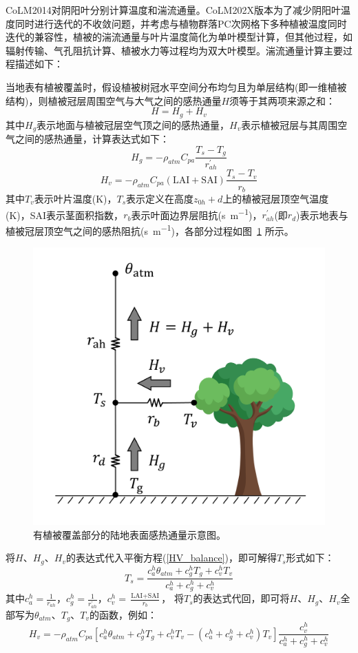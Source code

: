 CoLM2014对阴阳叶分别计算温度和湍流通量。CoLM202X版本为了减少阴阳叶温度同时进行迭代的不收敛问题，并考虑与植物群落PC次网格下多种植被温度同时迭代的兼容性，植被的湍流通量与叶片温度简化为单叶模型计算，但其他过程，如辐射传输、气孔阻抗计算、植被水力等过程均为双大叶模型。湍流通量计算主要过程描述如下：

当地表有植被覆盖时，假设植被树冠水平空间分布均匀且为单层结构(即一维植被结构)，则植被冠层周围空气与大气之间的感热通量$H$须等于其两项来源之和：
\begin{equation}\label{HV_balance}
H=H_{g}+H_{v}
\end{equation}
其中$H_{g}$表示地面与植被冠层空气顶之间的感热通量，$H_{v}$表示植被冠层与其周围空气之间的感热通量，计算表达式如下：
\begin{equation}
H_{g}=-\rho_{atm} C_{pa} \frac{T_{s}-T_{g}}{r_{a h}^{\prime}}
\end{equation}
\begin{equation}
H_{v}=-\rho_{atm} C_{pa}(\text {LAI}+\text {SAI}) \frac{T_{s}-T_{v}}{r_{b}}
\end{equation}
其中$T_v$表示叶片温度(K)，$T_s$表示定义在高度$z_{0h}+d$上的植被冠层顶空气温度(K)，SAI表示茎面积指数，$r_b$表示叶面边界层阻抗(\unit{s.m^{-1}})，$r_{ah}^\prime$(即$r_d$)表示地表与植被冠层顶空气之间的感热阻抗(\unit{s.m^{-1}})，各部分过程如图~\ref{fig:有植被覆盖部分的陆地表面感热通量示意图} 所示。
{
\begin{figure}[htbp]
\centering
\includegraphics[width=0.6\linewidth]{Figures/地表湍流交换过程/有植被感热交换阻抗示意图.png}
\caption{有植被覆盖部分的陆地表面感热通量示意图。}
\label{fig:有植被覆盖部分的陆地表面感热通量示意图}
\end{figure}
}
将$H$、$H_{g}$、$H_{v}$的表达式代入平衡方程(\ref{HV_balance})，即可解得$T_s$形式如下：
\begin{equation}
T_{s}=\frac{c_{a}^{h} \theta_{atm}+c_{g}^{h} T_{g}+c_{v}^{h} T_{v}}{c_{a}^{h}+c_{g}^{h}+c_{v}^{h}}
\end{equation}
其中$c_a^h=\frac{1}{r_{ah}}$，$c_g^h=\frac{1}{r_{ah}^\prime}$，$c_v^h=\frac{\text {LAI}+\text {SAI}}{r_b}$，
将$T_s$的表达式代回，即可将$H$、$H_{g}$、$H_{v}$全部写为$\theta_{atm}$、$T_g$、$T_v$的函数，例如：
\begin{equation}
H_{v}=-\rho_{atm} C_{p a}\left[c_{a}^{h} \theta_{atm}+c_{g}^{h} 
T_{g}+c_{v}^{h} T_{v}-\left(c_{a}^{h}+c_{g}^{h}+c_{v}^{h}\right)
T_{v}\right] \frac{c_{v}^{h}}{c_{a}^{h}+c_{g}^{h}+c_{v}^{h}}
\end{equation}


